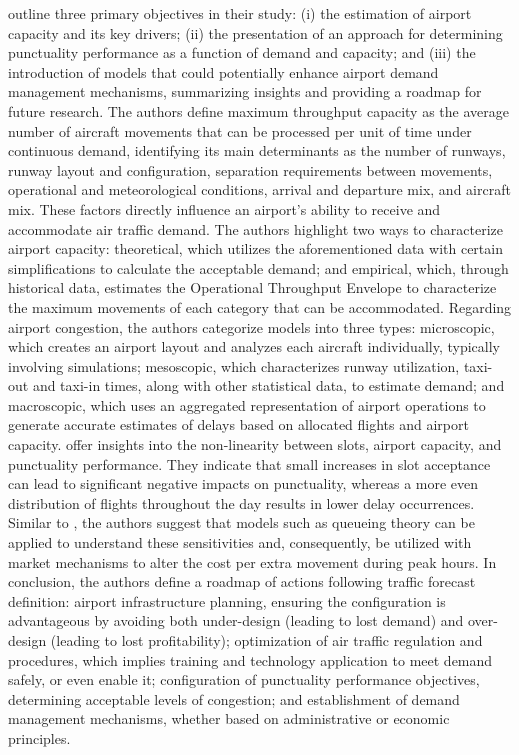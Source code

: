  outline three primary objectives in their study: (i) the estimation of airport capacity and its key drivers; (ii) the presentation of an approach for determining punctuality performance as a function of demand and capacity; and (iii) the introduction of models that could potentially enhance airport demand management mechanisms, summarizing insights and providing a roadmap for future research. The authors define maximum throughput capacity as the average number of aircraft movements that can be processed per unit of time under continuous demand, identifying its main determinants as the number of runways, runway layout and configuration, separation requirements between movements, operational and meteorological conditions, arrival and departure mix, and aircraft mix. These factors directly influence an airport's ability to receive and accommodate air traffic demand. The authors highlight two ways to characterize airport capacity: theoretical, which utilizes the aforementioned data with certain simplifications to calculate the acceptable demand; and empirical, which, through historical data, estimates the Operational Throughput Envelope to characterize the maximum movements of each category that can be accommodated. Regarding airport congestion, the authors categorize models into three types: microscopic, which creates an airport layout and analyzes each aircraft individually, typically involving simulations; mesoscopic, which characterizes runway utilization, taxi-out and taxi-in times, along with other statistical data, to estimate demand; and macroscopic, which uses an aggregated representation of airport operations to generate accurate estimates of delays based on allocated flights and airport capacity.  offer insights into the non-linearity between slots, airport capacity, and punctuality performance. They indicate that small increases in slot acceptance can lead to significant negative impacts on punctuality, whereas a more even distribution of flights throughout the day results in lower delay occurrences. Similar to , the authors suggest that models such as queueing theory can be applied to understand these sensitivities and, consequently, be utilized with market mechanisms to alter the cost per extra movement during peak hours. In conclusion, the authors define a roadmap of actions following traffic forecast definition: airport infrastructure planning, ensuring the configuration is advantageous by avoiding both under-design (leading to lost demand) and over-design (leading to lost profitability); optimization of air traffic regulation and procedures, which implies training and technology application to meet demand safely, or even enable it; configuration of punctuality performance objectives, determining acceptable levels of congestion; and establishment of demand management mechanisms, whether based on administrative or economic principles.

